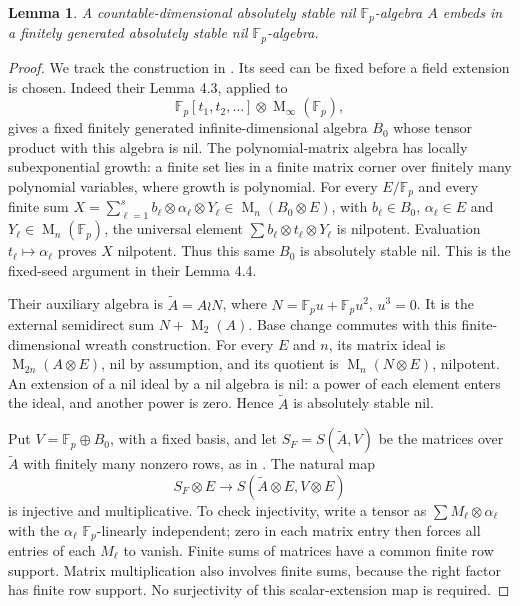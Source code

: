 \documentclass[11pt]{article}
\newtheorem{lemma}[theorem]{Lemma}
\theoremstyle{definition}
\newcommand{\Fp}{\mathbb F_p}
\newcommand{\Mat}{\operatorname{M}}
\begin{document}
\begin{lemma}\label{lem:absolute}
A countable-dimensional absolutely stable nil \(\Fp\)-algebra \(A\)
embeds in a finitely generated absolutely stable nil \(\Fp\)-algebra.
\end{lemma}
\begin{proof}
We track the construction in \cite[Lemmas 4.1, 4.3--4.5 and proof of
Theorem 4.3]{AAJZ}. Its seed can be fixed before a field extension is chosen.
Indeed their Lemma 4.3, applied to
\[
 \Fp[t_1,t_2,\ldots]\otimes\Mat_\infty(\Fp),
\]
gives a fixed finitely generated infinite-dimensional algebra \(B_0\)
whose tensor product with this algebra is nil.
The polynomial-matrix algebra has locally subexponential growth:
a finite set lies in a finite matrix corner over finitely many polynomial
variables, where growth is polynomial.
For every \(E/\Fp\) and every finite sum
\(X=\sum_{\ell=1}^s b_\ell\otimes\alpha_\ell\otimes Y_\ell
\in\Mat_n(B_0\otimes E)\), with \(b_\ell\in B_0\),
\(\alpha_\ell\in E\) and \(Y_\ell\in\Mat_n(\Fp)\), the universal element
\(\sum b_\ell\otimes t_\ell\otimes Y_\ell\) is nilpotent.
Evaluation \(t_\ell\mapsto\alpha_\ell\) proves \(X\) nilpotent.
Thus this same \(B_0\) is absolutely stable nil. This is the fixed-seed
argument in their Lemma 4.4.

Their auxiliary algebra is
\(\widetilde A=A\wr N\), where \(N=\Fp u+\Fp u^2\), \(u^3=0\).
It is the external semidirect sum \(N+\Mat_2(A)\).
Base change commutes with this finite-dimensional wreath construction.
For every \(E\) and \(n\), its matrix ideal is
\(\Mat_{2n}(A\otimes E)\), nil by assumption, and its quotient is
\(\Mat_n(N\otimes E)\), nilpotent. An extension of a nil ideal by a nil
algebra is nil: a power of each element enters the ideal, and another
power is zero. Hence \(\widetilde A\) is absolutely stable nil.

Put \(V=\Fp\oplus B_0\), with a fixed basis, and let
\(S_F=S(\widetilde A,V)\) be the matrices over \(\widetilde A\)
with finitely many nonzero rows, as in \cite{AAJZ}.
The natural map
\[
 S_F\otimes E\longrightarrow S(\widetilde A\otimes E,V\otimes E)
\]
is injective and multiplicative. To check injectivity, write a tensor as
\(\sum M_\ell\otimes\alpha_\ell\) with the \(\alpha_\ell\)
\(\Fp\)-linearly independent; zero in each matrix entry then forces
all entries of each \(M_\ell\) to vanish. Finite sums of matrices have a
common finite row support. Matrix multiplication also involves finite
sums, because the right factor has finite row support.
No surjectivity of this scalar-extension map is required.


\end{proof}
\end{document}
